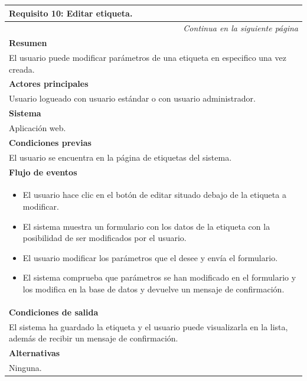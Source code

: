 \begin{longtable}{|p{}|}
\hline
 \rowcolor[gray]{.5}
 \color{white}\textbf{Requisito 10: Editar etiqueta.} \\
\hline
\endfirsthead
\endhead
\hline \multicolumn{1}{r}{\textit{Continua en la siguiente página}} \\
\endfoot
\endlastfoot
    \rowcolor[gray]{.9}
    \textbf{Resumen} \\
     \hline
     El usuario puede modificar parámetros de una etiqueta en especifico una vez creada. \\
    \hline
    \rowcolor[gray]{.9}
    \textbf{Actores principales} \\
     \hline
     Usuario logueado con usuario estándar o con usuario administrador. \\
    \hline
    \rowcolor[gray]{.9}
    \textbf{Sistema} \\
     \hline
     Aplicación web. \\
    \hline
    \rowcolor[gray]{.9}
    \textbf{Condiciones previas} \\
     \hline
     El usuario se encuentra en la página de etiquetas del sistema. \\
    \hline
    \rowcolor[gray]{.9}
    \textbf{Flujo de eventos}  \\
     \hline
      \begin{itemize}
        \item El usuario hace clic en el botón de editar situado debajo de la etiqueta a modificar.
        \item El sistema muestra un formulario con los datos de la etiqueta con la posibilidad de ser modificados por el usuario.
        \item El usuario modificar los parámetros que el desee y envía el formulario.
        \item El sistema comprueba que parámetros se han modificado en el formulario y los modifica en la base de datos y devuelve un mensaje de confirmación.
    \end{itemize} \\
    \hline
    \rowcolor[gray]{.9}
    \textbf{Condiciones de salida} \\
     \hline
     El sistema ha guardado la etiqueta y el usuario puede visualizarla en la lista, además de recibir un mensaje de confirmación. \\
    \hline
    \rowcolor[gray]{.9}
    \textbf{Alternativas}  \\
     \hline
      Ninguna. \\
    \hline
\end{longtable}

